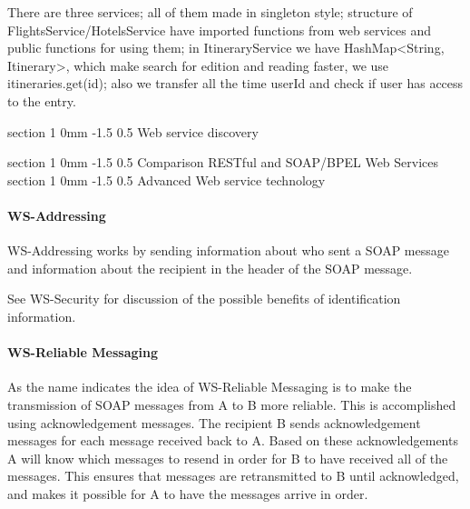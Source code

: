 \documentclass[english, a4paper, 12pt]{article}
\makeatletter
\renewcommand{\section}{\@startsection
{section}%
{1}%
{0mm}%
{-1.5\baselineskip}%
{0.5\baselineskip}%
{\normalfont\Large\bfseries}} %
\makeatother
\begin{document}
There are three services; all of them made in singleton style; structure of FlightsService/HotelsService have imported functions from web services and public functions for using them; in ItineraryService we have HashMap<String, Itinerary>, which make search for edition and reading faster, we use itineraries.get(id); also we transfer all the time userId and check if user has access to the entry. 



\section{Web service discovery}

\section{Comparison RESTful and SOAP/BPEL Web Services}
\section{Advanced Web service technology}
\paragraph{WS-Addressing}
WS-Addressing works by sending information about who sent a SOAP message and information about the recipient in the header of the SOAP message.

See WS-Security for discussion of the possible benefits of identification information.

\paragraph{WS-Reliable Messaging}
As the name indicates the idea of WS-Reliable Messaging is to make the transmission of SOAP messages from A to B more reliable. This is accomplished using acknowledgement messages. The recipient B sends acknowledgement messages for each message received back to A. Based on these acknowledgements A will know which messages to resend in order for B to have received all of the messages. This ensures that messages are retransmitted to B until acknowledged, and makes it possible for A to have the messages arrive in order.
\end{document}
